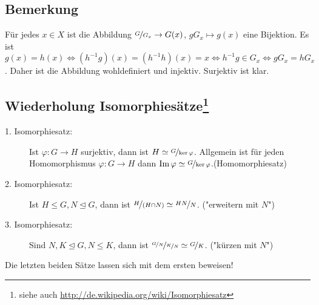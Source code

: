 \subsection[Bemerkung über eine Abbildung $\nicefrac{G}{G_x} \to G(x)$]{Bemerkung} %
\label{sub:12}
Für jedes $x \in X$ ist die Abbildung $\nicefrac{G}{G_x} \to G(x)$, $g G_x \mapsto g(x)$ eine Bijektion.
Es ist $g(x) = h(x) \iff (h ^{-1} g)(x)=(h^{-1}h)(x)=x \iff h ^{-1} g \in G_x \iff g G_x = h G_x$. Daher ist die Abbildung wohldefiniert und injektiv. Surjektiv ist klar. \bewende

\subsection*{Wiederholung Isomorphiesätze\footnote{siehe auch \url{http://de.wikipedia.org/wiki/Isomorphiesatz}}} %
\label{sub:wiederholung_isomorphiesätze}
\begin{description}
	\item[1. Isomorphiesatz:] Ist $\varphi : G \to H$ surjektiv, dann ist $H \simeq \nicefrac{G}{\ker \varphi}$. Allgemein ist für jeden Homomorphismus $\varphi : G \to H$
	dann $\operatorname{Im} \varphi \simeq \nicefrac{G}{\ker \varphi}$.\hfill {\color{lightgray}(Homomorphiesatz)}
	\item[2. Isomorphiesatz:] Ist $H \le G, N \unlhd G$, dann ist $\nicefrac{H}{(H \cap N)} \simeq \nicefrac{H N}{N}$.\hfill {\color{lightgray} ("{}erweitern mit $N$")}
	\item[3. Isomorphiesatz:] Sind $N,K \unlhd G, N \le K$, dann ist $\nicefrac{\nicefrac{G}{N}}{\nicefrac{K}{N}} \simeq \nicefrac{G}{K}$. \hfill
	{\color{lightgray} ("{}kürzen mit $N$")}
\end{description}
Die letzten beiden Sätze lassen sich mit dem ersten beweisen!

